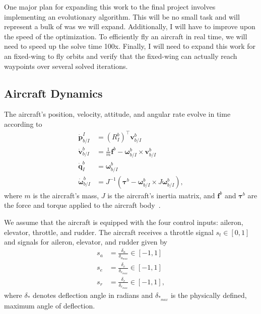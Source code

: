 \documentclass{article}
\begin{document}
One major plan for expanding this work to the final project involves implementing an evolutionary algorithm. This will be no small task and will represent a bulk of was we will expand. Additionally, I will have to improve upon the speed of the optimization. To efficiently fly an aircraft in real time, we will need to speed up the solve time 100x. Finally, I will need to expand this work for an fixed-wing to fly orbits and verify that the fixed-wing can actually reach waypoints over several solved iterations.



\begin{appendices}
	
\section{Aircraft Dynamics}
\label{sec:dynamics}

The aircraft's position, velocity, attitude, and angular rate evolve in time according to
\begin{align}
\dot{\mathbf{p}}_{b/I}^{I} & =\left(R_{I}^{b}\right)^{\top}\mathbf{v}_{b/I}^{b}\label{eq:lqr_pdot_true}\\
\dot{\mathbf{v}}_{b/I}^{b} & =\frac{1}{m}\mathbf{f}^{b}-\boldsymbol{\omega}_{b/I}^{b}\times\mathbf{v}_{b/I}^{b}\label{eq:lqr_vdot_true}\\
\dot{\mathbf{q}}_{I}^{b} & =\boldsymbol{\omega}_{b/I}^{b}\label{eq:lqr_qdot_true}\\
\dot{\boldsymbol{\omega}}_{b/I}^{b} & =J^{-1}\left(\boldsymbol{\tau}^{b}-\boldsymbol{\omega}_{b/I}^{b}\times J\boldsymbol{\omega}_{b/I}^{b}\right),\label{eq:lqr_omegadot_true}
\end{align}
where $m$ is the aircraft's mass, $J$ is the aircraft's inertia matrix, and $\mathbf{f}^b$ and $\boldsymbol{\tau}^b$ are the force and torque applied to the aircraft body~\cite{beard2012small}.

We assume that the aircraft is equipped with the four control inputs: aileron, elevator, throttle, and rudder.
The aircraft receives a throttle signal $s_t\in\left[0,1\right]$ and signals for aileron, elevator, and rudder given by
\begin{align}
s_{a} &= \frac{\delta_{a}}{\delta_{a_{max}}}\in\left[-1,1\right] \\
s_{e} &= \frac{\delta_{e}}{\delta_{e_{max}}}\in\left[-1,1\right] \\
s_{r} &= \frac{\delta_{r}}{\delta_{r_{max}}}\in\left[-1,1\right],
\end{align}
where $\delta_*$ denotes deflection angle in radians and $\delta_{*_{max}}$ is the physically defined, maximum angle of deflection.


\end{appendices}
\end{document}
